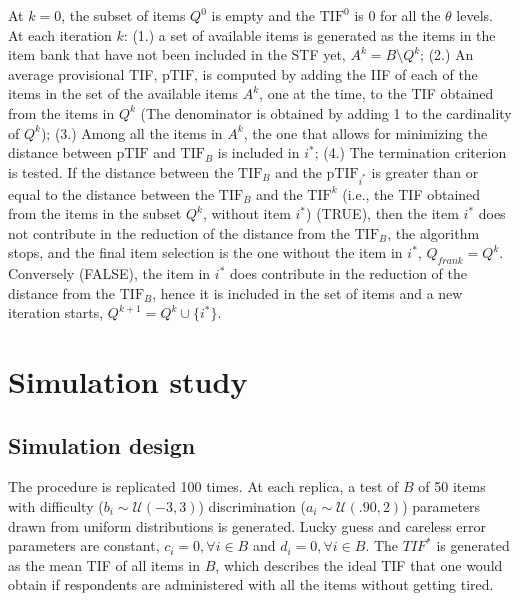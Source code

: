 \documentclass{svproc}
\begin{document}
At $k = 0$, the subset of items $Q^0$ is empty and the $\text{TIF}^0$ is 0 for all the $\theta$ levels. 
At each iteration $k$: (1.) a set of available items is generated as the items in the item bank that have not been included in the STF yet, $A^k = B \setminus Q^k$; (2.)
An average provisional TIF, $\text{pTIF}$, is computed by adding the IIF of each of the items in the set of the available items $A^k$, one at the time, to the TIF obtained from the items in $Q^k$ (The denominator is obtained by adding 1 to the cardinality of $Q^k$); (3.) Among all the items in $A^k$, the one that allows for minimizing the distance between $\text{pTIF}$ and $\text{TIF}_B$ is included in $i^*$; (4.) 
The termination criterion is tested. 
If the distance between the $\text{TIF}_B$ and the $\text{pTIF}_{i^*}$ is greater than or equal to the distance between the $\text{TIF}_B$ and the $\text{TIF}^k$ (i.e., the TIF obtained from the items in the subset $Q^k$, without item $i^*$) (TRUE), then the item $i^*$ does not contribute in the reduction of the distance from the $\text{TIF}_B$, the algorithm stops, and the final item selection is the one without the item in $i^*$, $Q_{frank} = Q^k$. Conversely (FALSE), the item in $i^*$ does contribute in the reduction of the distance from the $\text{TIF}_B$, hence it is included in the set of items and a new iteration starts, $Q^{k+1} = Q^k \cup \{i^*\}$.

\section{Simulation study}

\subsection{Simulation design}



The procedure is replicated 100 times. At each replica, a test of $B$ of 50 items with difficulty ($b_i \sim \mathcal{U}(-3, 3)$) discrimination ($a_i \sim \mathcal{U}(.90, 2)$) parameters drawn from uniform distributions is generated. Lucky 
guess and careless error parameters are constant, $c_i = 0, \forall i \in B$ and $d_i = 0, \forall i \in B$.
The $TIF^*$ is generated as the mean TIF of all items in $B$, which describes the ideal TIF that one would obtain if respondents are administered with all the items without getting tired. 
\end{document}
